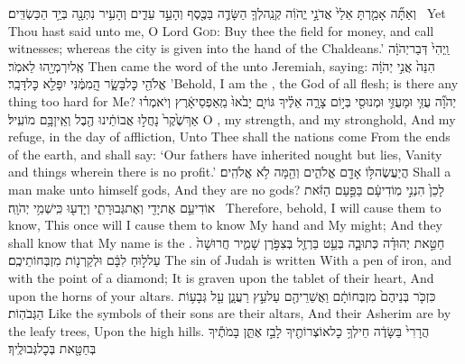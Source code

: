 {וְאַתָּ֞ה אָמַ֤רְתָּ אֵלַי֙ אֲדֹנָ֣י יֱהֹוִ֔ה קְנֵֽה\maqqaf לְךָ֧ הַשָּׂדֶ֛ה בַּכֶּ֖סֶף וְהָעֵ֣ד עֵדִ֑ים וְהָעִ֥יר נִתְּנָ֖ה בְּיַ֥ד הַכַּשְׂדִּֽים׃ \setuma }
{Yet Thou hast said unto me, O Lord \textsc{God}: Buy thee the field for money, and call witnesses; whereas the city is given into the hand of the Chaldeans.’}
{וַֽיְהִי֙ דְּבַר\maqqaf יְהֹוָ֔ה אֶֽל\maqqaf יִרְמְיָ֖הוּ לֵאמֹֽר׃}
{Then came the word of the \lord\space unto Jeremiah, saying:}
{הִנֵּה֙ אֲנִ֣י יְהֹוָ֔ה אֱלֹהֵ֖י כׇּל\maqqaf בָּשָׂ֑ר הֲֽמִמֶּ֔נִּי יִפָּלֵ֖א כׇּל\maqqaf דָּבָֽר׃}
{’Behold, I am the \lord, the God of all flesh; is there any thing too hard for Me?}
\label{haft_33}
\setcounter{chap}{16}
\setcounter{verse}{19}
{יְהֹוָ֞ה עֻזִּ֧י וּמָעֻזִּ֛י וּמְנוּסִ֖י בְּי֣וֹם צָרָ֑ה אֵלֶ֗יךָ גּוֹיִ֤ם יָבֹ֙אוּ֙ מֵֽאַפְסֵי\maqqaf אָ֔רֶץ וְיֹאמְר֗וּ אַךְ\maqqaf שֶׁ֙קֶר֙ נָחֲל֣וּ אֲבוֹתֵ֔ינוּ הֶ֖בֶל וְאֵֽין\maqqaf בָּ֥ם מוֹעִֽיל׃}
{O \lord, my strength, and my stronghold, And my refuge, in the day of affliction, Unto Thee shall the nations come From the ends of the earth, and shall say: ‘Our fathers have inherited nought but lies, Vanity and things wherein there is no profit.’}
{הֲיַעֲשֶׂה\maqqaf לּ֥וֹ אָדָ֖ם אֱלֹהִ֑ים וְהֵ֖מָּה לֹ֥א אֱלֹהִֽים׃}
{Shall a man make unto himself gods, And they are no gods?}
{לָכֵן֙ הִנְנִ֣י מֽוֹדִיעָ֔ם בַּפַּ֣עַם הַזֹּ֔את אוֹדִיעֵ֥ם אֶת\maqqaf יָדִ֖י וְאֶת\maqqaf גְּבוּרָתִ֑י וְיָדְע֖וּ כִּֽי\maqqaf שְׁמִ֥י יְהֹוָֽה׃ \setuma }
{Therefore, behold, I will cause them to know, This once will I cause them to know My hand and My might; And they shall know that My name is the \lord.}
\newperek
{}
{חַטַּ֣את יְהוּדָ֗ה כְּתוּבָ֛ה בְּעֵ֥ט בַּרְזֶ֖ל בְּצִפֹּ֣רֶן שָׁמִ֑יר חֲרוּשָׁה֙ עַל\maqqaf ל֣וּחַ לִבָּ֔ם וּלְקַרְנ֖וֹת מִזְבְּחוֹתֵיכֶֽם׃}
{The sin of Judah is written With a pen of iron, and with the point of a diamond; It is graven upon the tablet of their heart, And upon the horns of your altars.}
{כִּזְכֹּ֤ר בְּנֵיהֶם֙ מִזְבְּחוֹתָ֔ם וַאֲשֵׁרֵיהֶ֖ם עַל\maqqaf עֵ֣ץ רַעֲנָ֑ן עַ֖ל גְּבָע֥וֹת הַגְּבֹהֽוֹת׃}
{Like the symbols of their sons are their altars, And their Asherim are by the leafy trees, Upon the high hills.}
{הֲרָרִי֙ בַּשָּׂדֶ֔ה חֵילְךָ֥ כׇל\maqqaf אוֹצְרוֹתֶ֖יךָ לָבַ֣ז אֶתֵּ֑ן בָּמֹתֶ֕יךָ בְּחַטָּ֖את בְּכׇל\maqqaf גְּבוּלֶֽיךָ׃}
